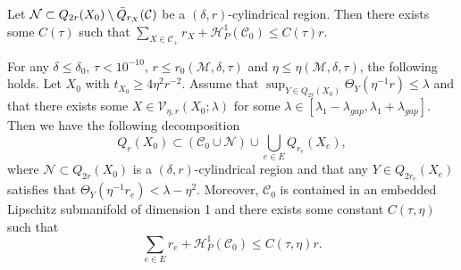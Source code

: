\documentclass[10pt,a4paper]{amsart}
\newcommand{\cC}{\mathcal{C}}
\newcommand{\cH}{\mathcal{H}}
\newcommand{\cM}{\mathcal{M}}
\newcommand{\cN}{\mathcal{N}}
\newcommand{\cV}{\mathcal{V}}
\begin{document}
\begin{corollary}\label{c:measure upper bound}
Let $\cN \subset Q_{2r}(X_0) \setminus \Bar{Q}_{r_X}(\cC)$ be a $(\delta,r)$-cylindrical region. Then there exists some $C(\tau)$ such that 
    $\sum_{X\in \cC_+} r_X + \cH^1_P(\cC_0)  \le C(\tau) r$. 
\end{corollary}

\begin{lemma}\label{l:c cover}
 For any $\delta \le \delta_0$, $\tau<10^{-10}$, $r \le r_0(\cM,\delta,\tau)$ and $\eta \le \eta(\cM,\delta,\tau)$, the following holds. Let $X_0$ with $t_{X_0}\ge 4\eta^2 r^{-2}$. Assume that $\sup_{Y\in Q_{2r}(X_0)}\Theta_Y(\eta^{-1}r) \le \lambda$ and that there exists some $X \in \cV_{\eta,r}(X_0;\lambda)$ for some $\lambda \in [\lambda_1 -\lambda_{gap}, \lambda_1 + \lambda_{gap}]$. Then we have the following decomposition
    \begin{equation*}
        Q_r(X_0) \subset (\cC_0 \cup \cN)  \cup \bigcup_{e \in E} Q_{r_e}(X_e),
    \end{equation*}
    where $\cN \subset Q_{2r}(X_0)$ is a $(\delta,r)$-cylindrical region and that any $Y \in Q_{2r_e}(X_e)$ satisfies that $\Theta_Y(\eta^{-1} r_e) < \lambda - \eta^2$. Moreover, $\cC_0$ is contained in an embedded Lipschitz submanifold of dimension 1 and there exists some constant $C(\tau,\eta)$ such that
    \begin{equation*}
        \sum_{e\in E} r_e +  \cH_P^1(\cC_0) \le C(\tau,\eta) r.
    \end{equation*}
\end{lemma}
\end{document}
